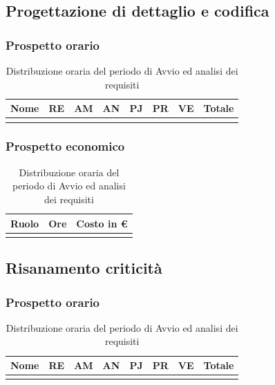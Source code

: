 \subsection{Progettazione di dettaglio e codifica}
\subsubsection{Prospetto orario}

\begin{longtable}{|C{.30\textwidth}|C{.06\textwidth}|C{.06\textwidth}|C{.06\textwidth} | C{.06\textwidth}| C{.06\textwidth} | C{.06\textwidth} | C{.10\textwidth} |}
\hline
\textbf{Nome} & \textbf{RE} & \textbf{AM} & \textbf{AN} & \textbf{PJ} & \textbf{PR} & \textbf{VE} & \textbf{Totale}\\
\hline 


\caption{Distribuzione oraria del periodo di Avvio ed analisi dei requisiti}
\label{Distribuzione oraria del periodo di Avvio ed analisi dei requisiti}
\end{longtable}

\subsubsection{Prospetto economico}
\begin{longtable}{| C{.30\textwidth}| C{.15\textwidth}| C{.20\textwidth}|}
\hline
\textbf{Ruolo} & \textbf{Ore} & \textbf{Costo in \euro} \\
\hline 


\caption{Distribuzione oraria del periodo di Avvio ed analisi dei requisiti}
\label{Distribuzione oraria del periodo di Avvio ed analisi dei requisiti}
\end{longtable}



\subsection{Risanamento criticità}
\subsubsection{Prospetto orario}
\begin{longtable}{|C{.30\textwidth}|C{.06\textwidth}|C{.06\textwidth}|C{.06\textwidth} | C{.06\textwidth}| C{.06\textwidth} | C{.06\textwidth} | C{.10\textwidth} |}
\hline
\textbf{Nome} & \textbf{RE} & \textbf{AM} & \textbf{AN} & \textbf{PJ} & \textbf{PR} & \textbf{VE} & \textbf{Totale}\\
\hline 


\caption{Distribuzione oraria del periodo di Avvio ed analisi dei requisiti}
\label{Distribuzione oraria del periodo di Avvio ed analisi dei requisiti}
\end{longtable}


